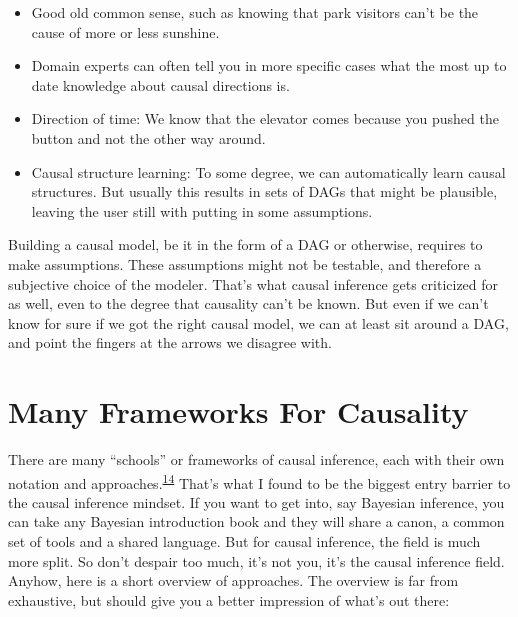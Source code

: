 \documentclass[
  10pt,
]{scrbook}
\providecommand{\tightlist}{%
  \setlength{\itemsep}{0pt}\setlength{\parskip}{0pt}}
\begin{document}
\begin{itemize}
\tightlist
\item
  Good old common sense, such as knowing that park visitors can't be the cause of more or less sunshine.
\item
  Domain experts can often tell you in more specific cases what the most up to date knowledge about causal directions is.
\item
  Direction of time: We know that the elevator comes because you pushed the button and not the other way around.
\item
  Causal structure learning: To some degree, we can automatically learn causal structures. But usually this results in sets of DAGs that might be plausible, leaving the user still with putting in some assumptions.
\end{itemize}

Building a causal model, be it in the form of a DAG or otherwise, requires to make assumptions.
These assumptions might not be testable, and therefore a subjective choice of the modeler.
That's what causal inference gets criticized for as well, even to the degree that causality can't be known.
But even if we can't know for sure if we got the right causal model, we can at least sit around a DAG, and point the fingers at the arrows we disagree with.

\hypertarget{many-frameworks-for-causality}{%
\section{Many Frameworks For Causality}\label{many-frameworks-for-causality}}

There are many ``schools'' or frameworks of causal inference, each with their own notation and approaches.\textsuperscript{\protect\hyperlink{ref-hernan2010causal}{14}}
That's what I found to be the biggest entry barrier to the causal inference mindset.
If you want to get into, say Bayesian inference, you can take any Bayesian introduction book and they will share a canon, a common set of tools and a shared language.
But for causal inference, the field is much more split.
So don't despair too much, it's not you, it's the causal inference field.
Anyhow, here is a short overview of approaches.
The overview is far from exhaustive, but should give you a better impression of what's out there:
\end{document}
